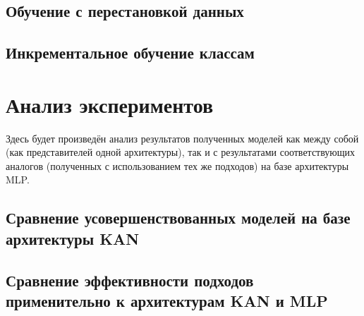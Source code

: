 \documentclass[a4paper,article,14pt]{extarticle}
\begin{document}
\subsection{Обучение с перестановкой данных}

\subsection{Инкрементальное обучение классам}

\pagebreak

\section{Анализ экспериментов}


Здесь будет произведён анализ результатов полученных моделей как между собой (как представителей одной архитектуры), так и с результатами соответствующих аналогов (полученных с использованием тех же подходов) на базе архитектуры MLP.

\subsection{Сравнение усовершенствованных моделей на базе архитектуры KAN}

\subsection{Сравнение эффективности подходов применительно к архитектурам KAN и MLP}

\pagebreak


\pagebreak


\pagebreak


\pagebreak


\end{document}
